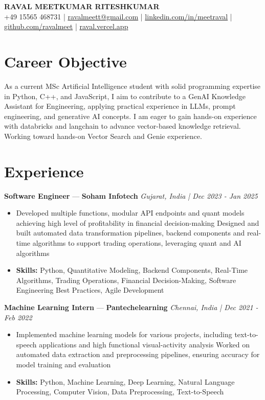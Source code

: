\documentclass[a4paper,10pt]{article}
\begin{document}
\begin{center}
  {\Large\bfseries RAVAL MEETKUMAR RITESHKUMAR}\\[2pt]
  {\small +49 15565 468731 \;|\; \href{mailto:ravalmeett@gmail.com}{ravalmeett@gmail.com} \;|\; \href{https://www.linkedin.com/in/meetraval/}{linkedin.com/in/meetraval} \;|\; \href{https://github.com/ravalmeet}{github.com/ravalmeet} \;|\; \href{https://raval.vercel.app/}{raval.vercel.app}}
\end{center}
\vspace{-3pt}

\section*{Career Objective}
As a current MSc Artificial Intelligence student with solid programming expertise in Python, C++, and JavaScript, I aim to contribute to a GenAI Knowledge Assistant for Engineering, applying practical experience in LLMs, prompt engineering, and generative AI concepts. I am eager to gain hands-on experience with databricks and langchain to advance vector-based knowledge retrieval. Working toward hands-on Vector Search and Genie experience.\par

\section*{Experience}
\textbf{Software Engineer} — \textbf{Soham Infotech} \hfill \textit{Gujarat, India \;|\; Dec 2023 - Jan 2025}\par
\vspace{1pt}
\begin{itemize}
  \item Developed multiple functions, modular API endpoints and quant models achieving high level of profitability in financial decision-making Designed and built automated data transformation pipelines, backend components and real-time algorithms to support trading operations, leveraging quant and AI algorithms
  \item \textbf{Skills:} Python, Quantitative Modeling, Backend Components, Real-Time Algorithms, Trading Operations, Financial Decision-Making, Software Engineering Best Practices, Agile Development
\end{itemize}
\vspace{3pt}
\textbf{Machine Learning Intern} — \textbf{Pantechelearning} \hfill \textit{Chennai, India \;|\; Dec 2021 - Feb 2022}\par
\vspace{1pt}
\begin{itemize}
  \item Implemented machine learning models for various projects, including text-to-speech applications and high functional visual-activity analysis Worked on automated data extraction and preprocessing pipelines, ensuring accuracy for model training and evaluation
  \item \textbf{Skills:} Python, Machine Learning, Deep Learning, Natural Language Processing, Computer Vision, Data Preprocessing, Text-to-Speech
\end{itemize}
\end{document}
